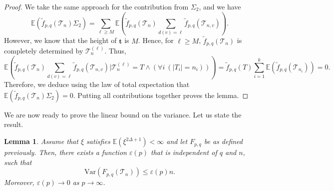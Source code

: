 \documentclass[article]{amsart}
\newcommand{\Var} {\mathrm {Var}}
\newcommand{\tc}{\mathcal{T}}
\newcommand{\st}{\textbf{t}}
\newcommand{\hf}{\tilde{f}_{p,q}}
\newcommand{\E}{\mathbb{E}}
\newtheorem{lemma}[theorem]{Lemma}
\theoremstyle{definition}
\theoremstyle{remark}
\begin{document}
\begin{proof}
We take the same approach for the contribution from $\Sigma_2$, and we have  
\[
\E\left(\hf(\tc_n)\Sigma_2\right) = \sum_{\ell\geq M}\mathbb{E}\left(\hf(\tc_n)\sum_{d(v)=\ell}\hf(\tc_{n,v})\right).
\]
However, we know that the height of $\st$ is $M$. Hence, for $\ell\geq M$, $\hf(\tc_n)$ is completely determined by $\tc_n^{(\ell)}$. Thus,
\[
\mathbb{E}\left(\hf(\tc_n)\sum_{d(v)=\ell}\hf(\tc_{n,v})\Big|\tc_n^{(\ell)}=T \wedge (\forall i \  (|T_i|=n_i) )\right)=\hf(T)\sum_{i=1}^{k}\E(\hf(\tc_{n_i}))=0.
\]
Therefore, we deduce using the law of total expectation that $\E\left(\hf(\tc_n)\Sigma_2\right)=0$. Putting all contributions together proves the lemma. 
\end{proof}
We are now ready to prove the linear bound on the variance. Let us state the result.
\begin{lemma}\label{lem:varesti}
Assume that $\xi$ satisfies $\mathbb{E}(\xi^{2\Delta+1})<\infty$ and let $F_{p,q}$ be as defined previously. Then, there exists a function $\varepsilon(p)$ that is independent of $q$ and $n$, such that 
\[
\Var(F_{p,q}(\tc_n))\leq \varepsilon(p)n.
\]
Moreover, $\varepsilon(p)\to 0$ as $p\to\infty$.
\end{lemma}
\end{document}

